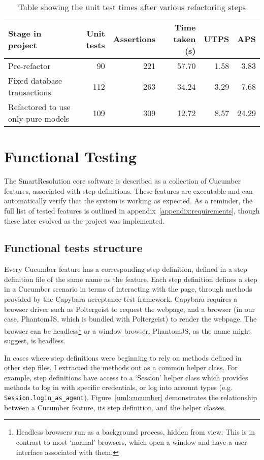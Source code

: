 \begin{table}[h!]
\label{table:testTimes}
\begin{center}
\begin{tabular}{ l | r | r | r | r | r}
  Stage in project & Unit tests & Assertions & Time taken (s) & UTPS & APS \\
  \hline
  Pre-refactor & 90 & 221 & 57.70 & 1.58 & 3.83\\
  Fixed database transactions & 112 & 263 & 34.24 & 3.29 & 7.68\\
  Refactored to use only pure models & 109 & 309 & 12.72 & 8.57 & 24.29
\end{tabular}
\end{center}
\caption {Table showing the unit test times after various refactoring steps}
\end{table}

\section{Functional Testing}

The SmartResolution core software is described as a collection of Cucumber features, associated with step definitions. These features are executable and can automatically verify that the system is working as expected. As a reminder, the full list of tested features is outlined in appendix~\ref{appendix:requirements}, though these later evolved as the project was implemented.

\subsection{Functional tests structure}

Every Cucumber feature has a corresponding step definition, defined in a step definition file of the same name as the feature. Each step definition defines a step in a Cucumber scenario in terms of interacting with the page, through methods provided by the Capybara acceptance test framework. Capybara requires a browser driver such as Poltergeist to request the webpage, and a browser (in our case, PhantomJS, which is bundled with Poltergeist) to render the webpage. The browser can be headless\footnote{Headless browsers run as a background process, hidden from view. This is in contrast to most `normal' browsers, which open a window and have a user interface associated with them.} or a window browser. PhantomJS, as the name might suggest, is headless.

In cases where step definitions were beginning to rely on methods defined in other step files, I extracted the methods out as a common helper class. For example, step definitions have access to a `Session' helper class which provides methods to log in with specific credentials, or log into account types (e.g. \lstinline{Session.login_as_agent}). Figure~\ref{uml:cucumber} demonstrates the relationship between a Cucumber feature, its step definition, and the helper classes.


